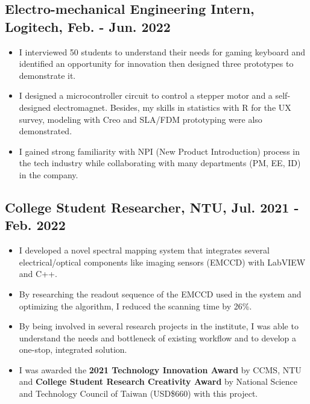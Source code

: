 \documentclass[12pt]{article}
\begin{document}
        \subsection*{Electro-mechanical Engineering Intern, Logitech, Feb. - Jun. 2022}
        {\sffamily
        \begin{itemize}
            \item I interviewed 50 students to understand their needs for gaming keyboard and identified an opportunity for innovation then designed three prototypes to demonstrate it.
            \item I designed a microcontroller circuit to control a stepper motor and a self-designed electromagnet. Besides, my skills in statistics with R for the UX survey, modeling with Creo and SLA/FDM prototyping were also demonstrated.
            \item I gained strong familiarity with NPI (New Product Introduction) process in the tech industry while collaborating with many departments (PM, EE, ID) in the company.
        \end{itemize}
        }
        \subsection*{College Student Researcher, NTU, Jul. 2021 - Feb. 2022}
        {\sffamily
        \begin{itemize}
            \item I developed a novel spectral mapping system that integrates several electrical/optical components like imaging sensors (EMCCD) with LabVIEW and C++. %
            \item By researching the readout sequence of the EMCCD used in the system and optimizing the algorithm, I reduced the scanning time by 26\%.
            \item By being involved in several research projects in the institute, I was able to understand the needs and bottleneck of existing workflow and to develop a one-stop, integrated solution.
            \item I was awarded the \textbf{2021 Technology Innovation Award} by CCMS, NTU and \textbf{College Student Research Creativity Award} by National Science and Technology Council of Taiwan (USD\$660) with this project.
        \end{itemize}}
\end{document}
